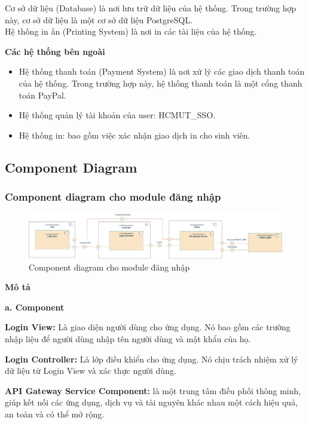\documentclass[a4paper]{article}
\begin{document}
Cơ sở dữ liệu (Database) là nơi lưu trữ dữ liệu của hệ thống. Trong trường hợp này, cơ sở dữ liệu là một cơ sở dữ liệu PostgreSQL.\\
Hệ thống in ấn (Printing System) là nơi in các tài liệu của hệ thống.

\textbf{Các hệ thống bên ngoài }
\begin{itemize}
    \item Hệ thống thanh toán (Payment System) là nơi xử lý các giao dịch thanh toán của hệ thống. Trong trường hợp này, hệ thống thanh toán là một cổng thanh toán PayPal.
    \item Hệ thống quản lý tài khoản của user: HCMUT\_SSO.
    \item Hệ thống in: bao gồm việc xác nhận giao dịch in cho sinh viên.
\end{itemize}
\subsection{Component Diagram}
\subsubsection{Component diagram cho module đăng nhập }
\begin{figure}[h!]
\begin{center}
\includegraphics[width=16cm]{picture/Login_component-Trang-3.drawio.png}
\caption{Component diagram cho module đăng nhập}
\end{center}
\end{figure}

\noindent \textbf{Mô tả}

\noindent \textbf{a. Component}

\textbf{Login View:} Là giao diện người dùng cho ứng dụng. Nó bao gồm các trường nhập liệu để người dùng nhập tên người dùng và mật khẩu của họ.

\textbf{Login Controller:} Là lớp điều khiển cho ứng dụng. Nó chịu trách nhiệm xử lý dữ liệu từ Login View và xác thực người dùng.

 \textbf{API Gateway Service Component:} là một trung tâm điều phối thông minh, giúp kết nối các ứng dụng, dịch vụ và tài nguyên khác nhau một cách hiệu quả, an toàn và có thể mở rộng.
 
\end{document}
